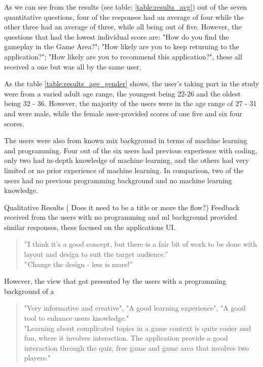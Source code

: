 	As we can see from the results (see table: \ref{table:results_avg}) out of the seven quantitative questions, four of the responses had an average of four while the other three had an average of three, while all being out of five. However, the questions that had the lowest individual score are: "How do you find the gameplay in the Game Area?"; "How likely are you to keep returning to the application?"; "How likely are you to recommend this application?", these all received a one but was all by the same user.
	
	As the table \ref{table:results_age_gender} shows, the user's taking part in the study were from a varied adult age range, the youngest being 22-26 and the oldest being 32 - 36. However, the majority of the users were in the age range of 27 - 31 and were male, while the female user-provided scores of one five and six four scores. 
	
	The users were also from known mix background in terms of machine learning and programming. Four out of the six users had previous experience with coding, only two had in-depth knowledge of machine learning, and the others had very limited or no prior experience of machine learning. In comparison, two of the users had no previous programming background and no machine learning knowledge.
	
	Qualitative Results ( Does it need to be a title or more the flow?)
	Feedback received from the users with no programming and ml background provided similar responses, these focused on the applications UI. 
	
	\begin{quote}
		\begin{changebar}
			''I think it's a good concept, but there is a fair bit of work to be done with layout and design to suit the target audience.'' \\
			''Change the design - less is more!''
		\end{changebar}
	\end{quote}
	
	However, the view that got presented by the users with a programming background of a 
	
	\begin{quote}
		\begin{changebar}
			"Very informative and creative", "A good learning experience", "A good tool to enhance users knowledge." 
			\\ "Learning about complicated topics in a game context is quite easier and fun, where it involves interaction. The application provide a good interaction through the quiz, free game and game area that involves two players." 
		\end{changebar}
	\end{quote}

